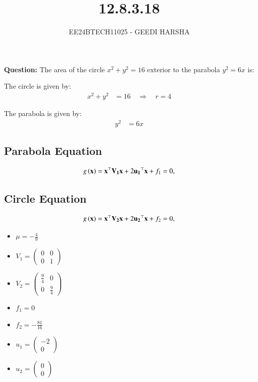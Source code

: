 \documentclass[journal]{IEEEtran}
\begin{document}

\vspace{3cm}
\title{12.8.3.18}
\author{EE24BTECH11025 - GEEDI HARSHA}
{\let\newpage\relax\maketitle}

\renewcommand{\thefigure}{\theenumi}
\renewcommand{\thetable}{\theenumi}
\setlength{\intextsep}{10pt} %


\renewcommand{\thetable}{\theenumi}

\textbf{Question:}
The area of the circle \(x^2 + y^2 = 16\) exterior to the parabola \(y^2 = 6x\) is:


\solution

The circle is given by:
\begin{align*}
x^2 + y^2 &= 16 \quad \Rightarrow \quad r = 4
\end{align*}

The parabola is given by:
\begin{align*}
y^2 &= 6x
\end{align*}
\subsection*{Parabola Equation}
\[
g\left(\mathbf{x}\right) = \mathbf{x}^\top \mathbf{V_1} \mathbf{x} + 2 \mathbf{u_1}^\top \mathbf{x} + f_1 = 0,
\]
\subsection*{Circle Equation}
\[
g\left(\mathbf{x}\right) = \mathbf{x}^\top \mathbf{V_2} \mathbf{x} + 2 \mathbf{u_2}^\top \mathbf{x} + f_2 = 0,
\]
\begin{itemize}
    \item \( \mu = -\frac{4}{9} \)
    \item \( V_1 = \begin{pmatrix} 0 & 0 \\ 0 & 1 \end{pmatrix} \)
    \item \( V_2 = \begin{pmatrix} \frac{9}{4} & 0 \\ 0 & \frac{9}{4} \end{pmatrix} \)
    \item \( f_1 = 0 \)
    \item \( f_2 = -\frac{81}{16} \)
    \item \( u_1 = \begin{pmatrix} -2 \\ 0 \end{pmatrix} \)
    \item \( u_2 = \begin{pmatrix} 0 \\ 0 \end{pmatrix} \)
\end{itemize}
\end{document}
